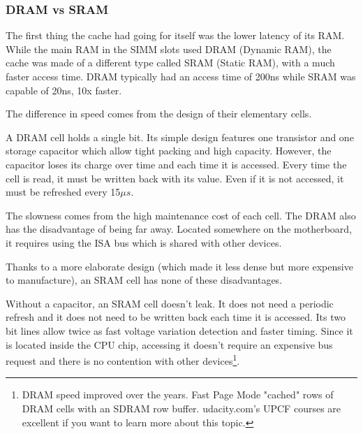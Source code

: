 \subsubsection{DRAM vs SRAM}
The first thing the cache had going for itself was the lower latency of its RAM. While the main RAM in the SIMM slots used DRAM (Dynamic RAM), the cache was made of a different type called SRAM (Static RAM), with a much faster access time. DRAM typically had an access time of 200ns while SRAM was capable of 20ns, 10x faster.\\
\par
The difference in speed comes from the design of their elementary cells.\\
\par
 A DRAM cell holds a single bit. Its simple design features one transistor and one storage capacitor which allow tight packing and high capacity. However, the capacitor loses its charge over time and each time it is accessed. Every time the cell is read, it must be written back with its value. Even if it is not accessed, it must be refreshed every 15$\mu s$.\\
\par
{}
\vspace{-5pt}
The slowness comes from the high maintenance cost of each cell. The DRAM also has the disadvantage of being far away. Located somewhere on the motherboard, it requires using the ISA bus which is shared with other devices.\\
\par

\vspace{2mm}
Thanks to a more elaborate design (which made it less dense but more expensive to manufacture), an SRAM cell has none of these disadvantages.\\
\par
{}
\par
Without a capacitor, an SRAM cell doesn't leak. It does not need a periodic refresh and it does not need to be written back each time it is accessed. Its two bit lines allow twice as fast voltage variation detection and faster timing.
Since it is located inside the CPU chip, accessing it doesn't require an expensive bus request and there is no contention with other devices\footnote{DRAM speed improved over the years. Fast Page Mode "cached" rows of DRAM cells with an SDRAM row buffer. udacity.com's UPCF courses are excellent if you want to learn more about this topic.}.
\par










